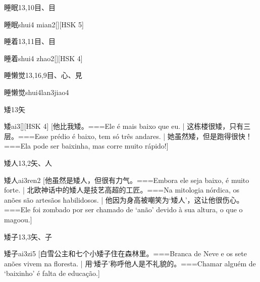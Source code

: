 \begin{Entry}{睡眠}{13,10}{⽬、⽬}
  \begin{Phonetics}{睡眠}{shui4 mian2}[][HSK 5]
  \end{Phonetics}
\end{Entry}

\begin{Entry}{睡着}{13,11}{⽬、⽬}
  \begin{Phonetics}{睡着}{shui4 zhao2}[][HSK 4]
  \end{Phonetics}
\end{Entry}

\begin{Entry}{睡懒觉}{13,16,9}{⽬、⼼、⾒}
  \begin{Phonetics}{睡懒觉}{shui4lan3jiao4}
  \end{Phonetics}
\end{Entry}

\begin{Entry}{矮}{13}{⽮}
  \begin{Phonetics}{矮}{ai3}[][HSK 4]
    [他比我矮。===Ele é mais baixo que eu. | 这栋楼很矮，只有三层。===Esse prédio é baixo, tem só três andares. | 她虽然矮，但是跑得很快！===Ela pode ser baixinha, mas corre muito rápido!]
  \end{Phonetics}
\end{Entry}

\begin{Entry}{矮人}{13,2}{⽮、⼈}
  \begin{Phonetics}{矮人}{ai3ren2}
    [他虽然是矮人，但很有力气。===Embora ele seja baixo, é muito forte. | 北欧神话中的矮人是技艺高超的工匠。===Na mitologia nórdica, os anões são artesãos habilidosos. | 他因为身高被嘲笑为‘矮人’，这让他很伤心。===Ele foi zombado por ser chamado de ‘anão’ devido à sua altura, o que o magoou.]
  \end{Phonetics}
\end{Entry}

\begin{Entry}{矮子}{13,3}{⽮、⼦}
  \begin{Phonetics}{矮子}{ai3zi5}
    [白雪公主和七个小矮子住在森林里。===Branca de Neve e os sete anões vivem na floresta. | 用`矮子'称呼他人是不礼貌的。===Chamar alguém de `baixinho' é falta de educação.]
  \end{Phonetics}
\end{Entry}

